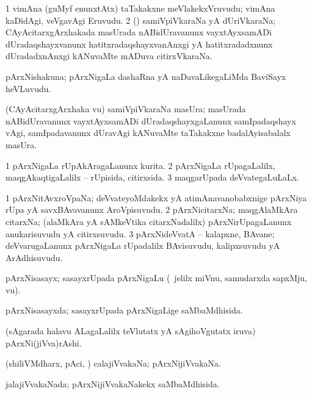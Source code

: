 \bentry
{} 
\gl{\nA} 
\bmng
\bnum
\num{1} vimAna (guMyf enunxtAtx) taTakakxne meVlakekxVruvudu; vimAna kaDidAgi, veVgavAgi Eruvudu. 
\num{2} (\CA) samiVpiVkaraNa yA dUriVkaraNa; CAyAcitarxgArxhakada masUrada nABidUravanunx vayxtAyxsamADi dUradaqshayxvanunx hatitxradaqshayxvanAnxgi yA hatitxradadxnunx dUradadxnAnxgi kANuvaMte mADuva citirxVkaraNa.
\enum
\emng
\eentry

\bentry
{} 
\gl{\nA} 
\bmng
pArxNishakuna; pArxNigaLa dashaRna yA naDavaLikegaLiMda BaviSayx heVLuvudu. 
\emng
\eentry

\bentry
{} 
\gl{\nA} 
\bmng
(CAyAcitarxgArxhaka \mo vu) samiVpiVkaraNa masUra; masUrada nABidUravanunx vayxtAyxsamADi dUradaqshayxgaLanunx samIpadaqshayx vAgi, samIpadavanunx dUravAgi kANuvaMte taTakakxne badalAyisabalalx masUra.
\emng
\eentry

\bentry
{} 
\gl{\gu} 
\bmng
\bnum
\num{1} pArxNigaLa rUpAkAragaLanunx kurita. 
\num{2} pArxNigaLa rUpagaLalilx, maqgAkaqtigaLalilx -- rUpisida, citirxsida. 
\num{3} maqgarUpada deVvategaLuLaLx.
\enum
\emng
\eentry

\bentry
{} 
\gl{\nA} 
\bmng
\bnum
\num{1} pArxNitAvxroVpaNa;  deVvateyoMdakekx yA atimAnavanobabxnige pArxNiya rUpa yA savxBAvavanunx AroVpisuvudu. 
\num{2} pArxNicitarxNa; maqgAlaMkAra citarxNa; (alaMkAra yA sAMkeVtika citarxNadalilx) pArxNirUpagaLanunx anukarisuvudu yA citirxsuvudu. 
\num{3} pArxNideVvatA -- kalapxne, BAvane; deVvarugaLanunx pArxNigaLa rUpadalilx BAvisuvudu, kalipxsuvudu yA ArAdhisuvudu.
\enum
\emng 
\eentry

\bentry
{} 
\gl{\nA} 
\bmng
pArxNisasayx; sasayxrUpada pArxNigaLu (\udA\ jelilx miVnu, samudarxda sapxMju, \mo vu).
\emng
\eentry

\bentry
{} 
\gl{\gu} 
\bmng
pArxNisasayxda; sasayxrUpada pArxNigaLige saMbaMdhisida.
\emng 
\eentry

\bentry
{} 
\gl{\nA} 
\bmng
(sAgarada halavu ALagaLalilx teVlutatx yA sAgihoVgutatx iruva) pArxNi(jiVva)rAshi.
\emng
\eentry

\bentry
{} 
\gl{\nA} 
\bmng
(shiliVMdharx, pAci, \mo) calajiVvakaNa; pArxNijiVvakaNa.
\emng
\eentry

\bentry
{} 
\gl{\gu} 
\bmng
jalajiVvakaNada; pArxNijiVvakaNakekx saMbaMdhisida.
\emng
\eentry


